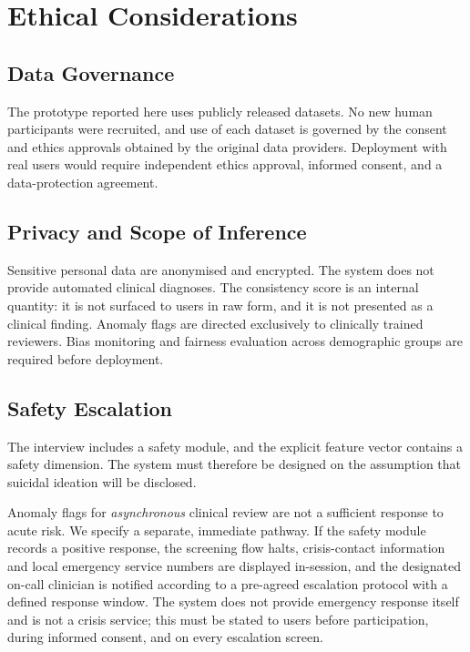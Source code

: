 \documentclass[12pt]{article}
\begin{document}
\section{Ethical Considerations}

\subsection{Data Governance}

The prototype reported here uses publicly released datasets. No new
human participants were recruited, and use of each dataset is governed
by the consent and ethics approvals obtained by the original data
providers. Deployment with real users would require independent ethics
approval, informed consent, and a data-protection agreement.

\subsection{Privacy and Scope of Inference}

Sensitive personal data are anonymised and encrypted. The system does
not provide automated clinical diagnoses. The consistency score is an
internal quantity: it is not surfaced to users in raw form, and it is
not presented as a clinical finding. Anomaly flags are directed
exclusively to clinically trained reviewers. Bias monitoring and
fairness evaluation across demographic groups are required before
deployment.

\subsection{Safety Escalation}
\label{sec:safety}

The interview includes a safety module, and the explicit feature vector
contains a safety dimension. The system must therefore be designed on
the assumption that suicidal ideation will be disclosed.

Anomaly flags for \emph{asynchronous} clinical review are not a
sufficient response to acute risk. We specify a separate, immediate
pathway. If the safety module records a positive response, the
screening flow halts, crisis-contact information and local emergency
service numbers are displayed in-session, and the designated on-call
clinician is notified according to a pre-agreed escalation protocol
with a defined response window. The system does not provide emergency
response itself and is not a crisis service; this must be stated to
users before participation, during informed consent, and on every
escalation screen.
\end{document}
